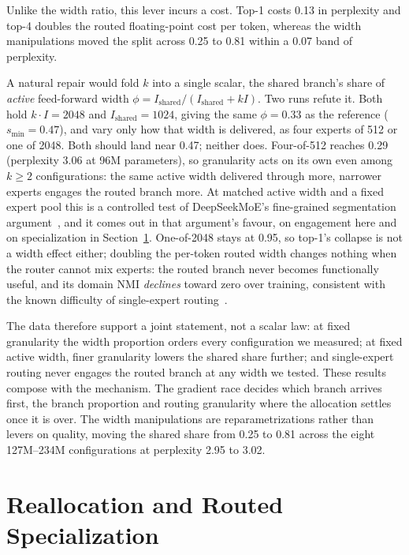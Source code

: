 \documentclass[conference,11pt]{IEEEtran}
\begin{document}
Unlike the width ratio, this lever incurs a cost. Top-1 costs 0.13 in perplexity and top-4 doubles
the routed floating-point cost per token, whereas the width manipulations moved the split across
0.25 to 0.81 within a 0.07 band of perplexity.

A natural repair would fold $k$ into a single scalar, the shared branch's share of \emph{active}
feed-forward width $\phi = I_{\mathrm{shared}}/(I_{\mathrm{shared}} + kI)$. Two runs refute it.
Both hold $k\cdot I = 2048$ and $I_{\mathrm{shared}} = 1024$, giving the same $\phi = 0.33$ as the
reference ($s_{\min} = 0.47$), and vary only how that width is delivered, as four experts of 512
or one of 2048. Both should land near 0.47; neither does. Four-of-512 reaches 0.29 (perplexity
3.06 at 96M parameters), so granularity acts on its own even among $k\geq2$ configurations: the
same active width delivered through more, narrower experts engages the routed branch more. At
matched active width and a fixed expert pool this is a controlled test of DeepSeekMoE's
fine-grained segmentation argument~\cite{dai2024deepseekmoe}, and it comes out in that argument's
favour, on engagement here and on specialization in Section~\ref{sec:spec}. One-of-2048 stays at
0.95, so top-1's collapse is not a width effect either; doubling the per-token routed width
changes nothing when the router cannot mix experts: the routed branch never becomes functionally
useful, and its domain NMI \emph{declines} toward zero over training, consistent with the known difficulty
of single-expert routing~\cite{fedus2022switch}.

The data therefore support a joint statement, not a scalar law: at fixed granularity the width
proportion orders every configuration we measured; at fixed active width, finer granularity lowers
the shared share further; and single-expert routing never engages the routed branch at any width
we tested. These results compose with the mechanism. The gradient race decides which branch
arrives first, the branch proportion and routing granularity where the allocation settles once it
is over. The width manipulations are reparametrizations rather than levers on quality, moving the
shared share from 0.25 to 0.81 across the eight 127M--234M configurations at perplexity 2.95 to
3.02.

\section{Reallocation and Routed Specialization}
\label{sec:spec}
\end{document}
